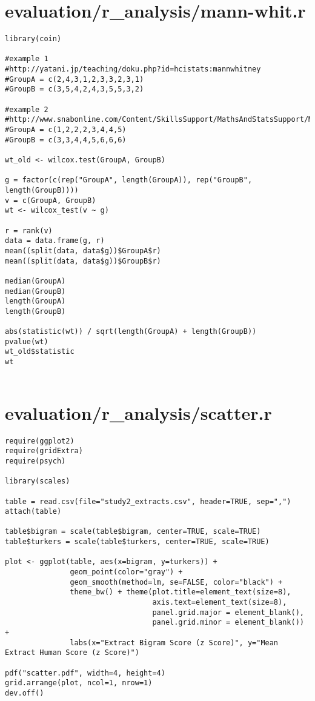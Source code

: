 \documentclass{article}
\begin{document}
\pagebreak

\section*{evaluation/r\_analysis/mann-whit.r}
\begin{verbatim}
library(coin)

#example 1
#http://yatani.jp/teaching/doku.php?id=hcistats:mannwhitney
#GroupA = c(2,4,3,1,2,3,3,2,3,1)
#GroupB = c(3,5,4,2,4,3,5,5,3,2)

#example 2
#http://www.snabonline.com/Content/SkillsSupport/MathsAndStatsSupport/M0_14S.pdf
#GroupA = c(1,2,2,2,3,4,4,5)
#GroupB = c(3,3,4,4,5,6,6,6)

wt_old <- wilcox.test(GroupA, GroupB)

g = factor(c(rep("GroupA", length(GroupA)), rep("GroupB", length(GroupB))))
v = c(GroupA, GroupB)
wt <- wilcox_test(v ~ g)

r = rank(v)
data = data.frame(g, r)
mean((split(data, data$g))$GroupA$r)
mean((split(data, data$g))$GroupB$r)

median(GroupA)
median(GroupB)
length(GroupA)
length(GroupB)

abs(statistic(wt)) / sqrt(length(GroupA) + length(GroupB))
pvalue(wt)
wt_old$statistic
wt


\end{verbatim}
\pagebreak

\section*{evaluation/r\_analysis/scatter.r}
\begin{verbatim}
require(ggplot2)
require(gridExtra)
require(psych)

library(scales)

table = read.csv(file="study2_extracts.csv", header=TRUE, sep=",")
attach(table)

table$bigram = scale(table$bigram, center=TRUE, scale=TRUE)
table$turkers = scale(table$turkers, center=TRUE, scale=TRUE)

plot <- ggplot(table, aes(x=bigram, y=turkers)) +
               geom_point(color="gray") +
               geom_smooth(method=lm, se=FALSE, color="black") +
               theme_bw() + theme(plot.title=element_text(size=8),
                                  axis.text=element_text(size=8),
                                  panel.grid.major = element_blank(),
                                  panel.grid.minor = element_blank()) +
               labs(x="Extract Bigram Score (z Score)", y="Mean Extract Human Score (z Score)")

pdf("scatter.pdf", width=4, height=4)
grid.arrange(plot, ncol=1, nrow=1)
dev.off()


\end{verbatim}
\pagebreak
\end{document}
